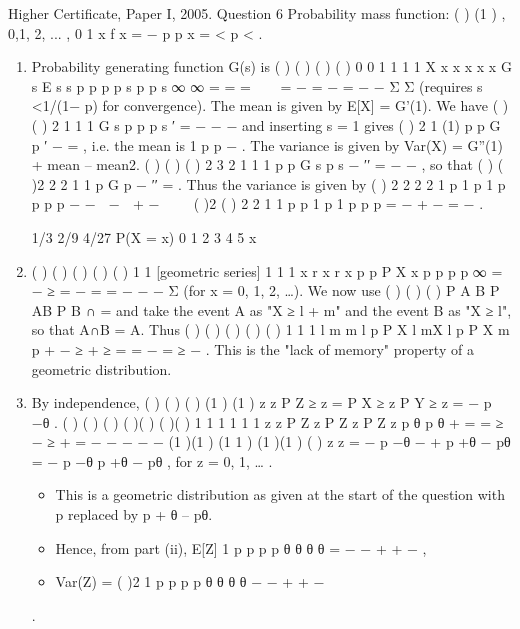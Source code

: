 \documentclass[a4paper,12pt]{article}
\begin{document}
Higher Certificate, Paper I, 2005. Question 6
Probability mass function: ( ) (1 ) , 0,1, 2, ... , 0 1 x f x = − p p x = < p < .
\begin{enumerate}
    \item Probability generating function G(s) is
( ) ( ) {( ) } ( ) 0 0
1 1
1 1
X x x x
x x
G s E s s p p p p s p
p s
∞ ∞
= =
=   = − = − = − − Σ Σ
(requires s <1/(1− p) for convergence).
The mean is given by E[X] = G'(1). We have ( )
{ ( ) }2
1
1 1
G s p p
p s
′ = −
− −
and inserting
s = 1 gives ( )
2
1
(1)
p p
G
p
′ − = , i.e. the mean is 1 p
p
− .
The variance is given by Var(X) = G''(1) + mean – mean2. ( ) ( )
{ ( ) }
2
3
2 1
1 1
p p
G s
p s
−
′′ =
− −
, so
that ( ) ( )2
2
2 1
1
p
G
p
−
′′ = . Thus the variance is given by ( ) 2 2
2
2 1 p 1 p 1 p
p p p
− −  −  + − 
 
{( )2 ( )}
2 2
1 1 p p 1 p 1 p
p p
= − + − = − .

1/3
2/9
4/27
P(X = x)
0 1 2 3 4 5
x
\item  ( ) ( ) ( )
( ) ( ) 1
1 [geometric series] 1
1 1
x
r x
r x
p p
P X x p p p
p
∞
=
−
≥ = − = = −
− − Σ (for x =
0, 1, 2, …). We now use ( ) ( )
( )
P A B
P AB
P B
∩
= and take the event A as "X ≥ l + m"
and the event B as "X ≥ l", so that A∩B = A. Thus
( ) ( )
( )
( ) ( ) 1
1
1
l m
m
l
p
P X l mX l p P X m
p
+ −
≥ + ≥ = = − = ≥
−
.
This is the "lack of memory" property of a geometric distribution.
\item  By independence, ( ) ( ) ( ) (1 ) (1 ) z z P Z ≥ z = P X ≥ z P Y ≥ z = − p −θ .
( ) ( ) ( ) {( )( )} {( )( )} 1 1 1 1 1 1 z z P Z z P Z z P Z z p θ p θ + = = ≥ − ≥ + = − − − − −
{(1 )(1 )} (1 1 ) {(1 )(1 )} ( ) z z = − p −θ − + p +θ − pθ = − p −θ p +θ − pθ , for z = 0, 1, … .
\begin{itemize}
\item This is a geometric distribution as given at the start of the question with p replaced by
p + θ – pθ. 
\item Hence, from part (ii),
E[Z] 1 p p
p p
θ θ
θ θ
= − − +
+ −
, 
\item Var(Z) =
( )2
1 p p
p p
θ θ
θ θ
− − +
+ −
\end{itemize}
.

\end{enumerate}
\end{document}
